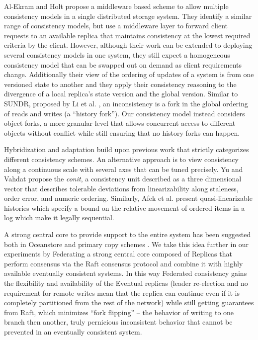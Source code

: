 \documentclass[10pt,conference,letterpaper]{IEEEtran}
\begin{document}
Al-Ekram and Holt \cite{al-ekram_multi-consistency_2010} propose a middleware
based scheme to allow multiple consistency models in a single distributed
storage system.
They identify a similar range of consistency models, but use a middleware
layer to forward client requests to an available replica that maintains
consistency at the lowest required criteria by the client.
However, although their work can be extended to deploying several consistency
models in one system, they still expect a homogeneous consistency model that
can be swapped out on demand as client requirements change.
Additionally their view of the ordering of updates of a system is from one
versioned state to another and they apply their consistency reasoning to the
divergence of a local replica's state version and the global version.
Similar to SUNDR, proposed by Li et al.
\cite{li_secure_2004}, an inconsistency is a fork in the global ordering of
reads and writes (a ``history fork'').
Our consistency model instead considers object forks, a more granular level
that allows concurrent access to different objects without conflict while
still ensuring that no history forks can happen.

Hybridization and adaptation build upon previous work that strictly
categorizes different consistency schemes.
An alternative approach is to view consistency along a continuous scale with
several axes that can be tuned precisely.
Yu and Vahdat \cite{yu_design_2002} propose the \textit{conit}, a consistency
unit described as a three dimensional vector that describes tolerable
deviations from linearizability along staleness, order error, and numeric
ordering.
Similarly, Afek et al.
\cite{afek_quasi-linearizability:_2010} present quasi-linearizable histories
which specify a bound on the relative movement of ordered items in a log which
make it legally sequential.

A strong central core to provide support to the entire system has been
suggested both in Oceanstore \cite{kubiatowicz_oceanstore:_2000} and primary
copy schemes \cite{gray_dangers_1996}.
We take this idea further in our experiments by Federating a strong central
core composed of Replicas that perform consensus via the Raft consensus
protocol and combine it with highly available eventually consistent systems.
In this way Federated consistency gains the flexibility and availability of
the Eventual replicas (leader re-election and no requirement for remote writes
mean that the replica can continue even if it is completely partitioned from
the rest of the network) while still getting guarantees from Raft, which
minimizes ``fork flipping'' -- the behavior of writing to one branch then
another, truly pernicious inconsistent behavior that cannot be prevented in an
eventually consistent system.
\end{document}
